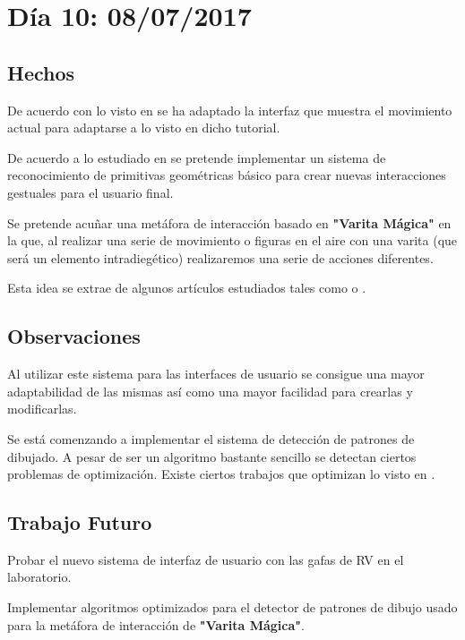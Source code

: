 \documentclass[12pt,a4paper]{article}
\begin{document}
\section{Día 10: 08/07/2017}

\subsection{Hechos}

De acuerdo con lo visto en \cite{Unity Tutorials} se ha adaptado la interfaz que muestra el movimiento actual para adaptarse a lo visto en dicho tutorial.

De acuerdo a lo estudiado en \cite{Vanhatalo} se pretende implementar un sistema de reconocimiento de primitivas geométricas básico para crear nuevas interacciones gestuales para el usuario final.

Se pretende acuñar una metáfora de interacción basado en \textbf{"Varita Mágica"} en la que, al realizar una serie de movimiento o figuras en el aire con una varita (que será un elemento intradiegético) realizaremos una serie de acciones diferentes.

Esta idea se extrae de algunos artículos estudiados tales como \cite{Rausch et al.} o \cite{Clifford et al.}.

\subsection{Observaciones}

Al utilizar este sistema para las interfaces de usuario se consigue una mayor adaptabilidad de las mismas así como una mayor facilidad para crearlas y modificarlas.

Se está comenzando a implementar el sistema de detección de patrones de dibujado. A pesar de ser un algoritmo bastante sencillo se detectan ciertos problemas de optimización.
Existe ciertos trabajos que optimizan lo visto en \cite{Vanhatalo}.

\subsection{Trabajo Futuro}

Probar el nuevo sistema de interfaz de usuario con las gafas de RV en el laboratorio.

Implementar algoritmos optimizados para el detector de patrones de dibujo usado para la metáfora de interacción de \textbf{"Varita Mágica"}.

\break
\end{document}
